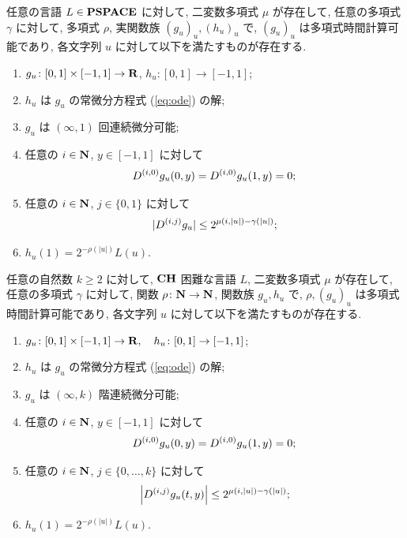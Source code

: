 \begin{lemma}
 \label{DifferentiableFamily}
 任意の言語 $L \in \mathbf{PSPACE}$ に対して, 
 二変数多項式 $\mu$ が存在して,
 任意の多項式 $\gamma$ に対して,
 多項式 $\rho$, 実関数族 $(g_u)_u, (h_u)_u$ で, 
 $(g_u)_u$ は多項式時間計算可能であり,
 各文字列 $u$ に対して以下を満たすものが存在する.
 \begin{enumerate}
  \item $g_u\colon [0,1] \times [-1,1]\to \mathbf R$, $h_u\colon [0,1] \to [-1,1]$;
  \item $h_u$ は $g_u$ の常微分方程式 (\ref{eq:ode}) の解; 
  \item $g_u$ は $(\infty, 1)$ 回連続微分可能;
  \item 任意の $i \in \mathbf N$, $y \in [-1,1]$ に対して
	\begin{equation*}
	 D ^{(i, 0)} g_u(0,y) = D ^{(i, 0)} g_u(1,y) = 0;
	\end{equation*}
  \item \label{enum:infty1}
	任意の $i \in \mathbf N$, $j \in \{0,1\}$ に対して
	\begin{equation*}
	 |D ^{(i,j)} g_u| \leq 2^{\mu(i, |u|) - \gamma(|u|)};
	\end{equation*}
  \item $h_u(1) = 2^{-\rho(|u|)}L(u)$.
 \end{enumerate}
\end{lemma}


 \begin{lemma}
  \label{KTimesFamily}
  任意の自然数 $k \ge 2$ に対して,
  $\mathbf{CH}$ 困難な言語 $L$,
  二変数多項式 $\mu$ が存在して,
  任意の多項式 $\gamma$ に対して,
  関数 $\rho \colon \mathbf N \to \mathbf N$, 関数族 $g_u, h_u$ で,
  $\rho, (g_u)_u$ は多項式時間計算可能であり,
  各文字列 $u$ に対して以下を満たすものが存在する.
  \begin{enumerate}
   \item $g_u\colon [0,1] \times [-1,1]\to \mathbf R, \quad h_u\colon [0,1] \to [-1,1]$;
   \item $h_u$ は $g_u$ の常微分方程式 (\ref{eq:ode}) の解;
   \item $g_u$ は $(\infty, k)$ 階連続微分可能;
   \item \label{enum:boundary}
	 任意の $i \in \mathbf N$, $y \in [-1,1]$ に対して
	 \begin{equation*}
	  D^{(i, 0)} g_u(0,y) = D^{(i, 0)} g_u(1,y) = 0 ;
	 \end{equation*}
   \item \label{enum:inftyk}
	 任意の $i \in \mathbf N$, $j \in \{0, \dots, k\}$ に対して
	 \begin{equation*}
	  \left|D^{(i,j)} g_u(t,y)\right| \le 2^{\mu(i, |u|) - \gamma(|u|)};
	 \end{equation*}
   \item $h_u(1) = 2^{-\rho(|u|)}L(u)$.
  \end{enumerate}
 \end{lemma}


